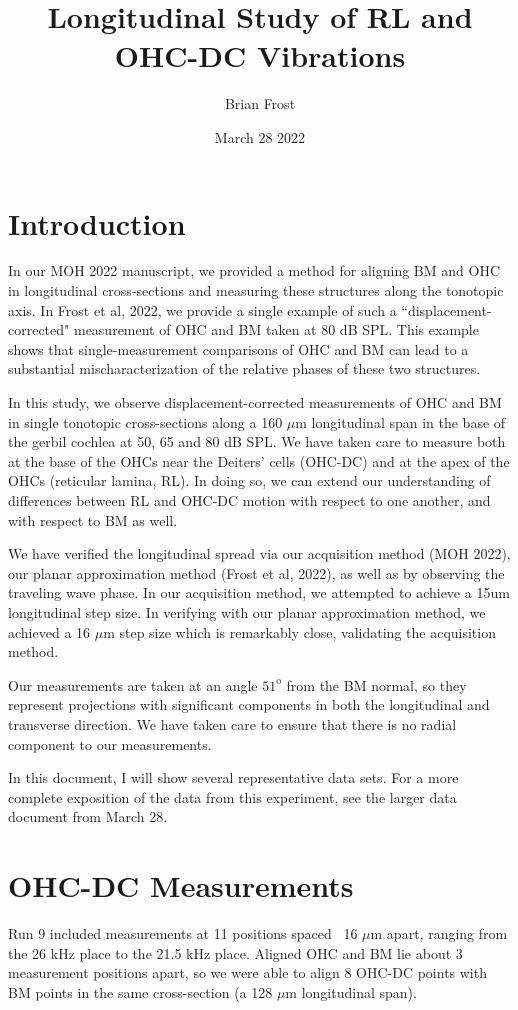 \documentclass{article}
\title{Longitudinal Study of RL and OHC-DC Vibrations}
\author{Brian Frost}
\date{March 28 2022}
\begin{document}
\maketitle

\section{Introduction}

\par{In our MOH 2022 manuscript, we provided a method for aligning BM and OHC in longitudinal cross-sections and measuring these structures along the tonotopic axis. In Frost et al, 2022, we provide a single example of such a ``displacement-corrected" measurement of OHC and BM taken at 80 dB SPL. This example shows that single-measurement comparisons of OHC and BM can lead to a substantial mischaracterization of the relative phases of these two structures.}
\par{In this study, we observe displacement-corrected measurements of OHC and BM in single tonotopic cross-sections along a 160 $\mu$m longitudinal span in the base of the gerbil cochlea at 50, 65 and 80 dB SPL. We have taken care to measure both at the base of the OHCs near the Deiters' cells (OHC-DC) and at the apex of the OHCs (reticular lamina, RL). In doing so, we can extend our understanding of differences between RL and OHC-DC motion with respect to one another, and with respect to BM as well.}
\par{We have verified the longitudinal spread via our acquisition method (MOH 2022), our planar approximation method (Frost et al, 2022), as well as by observing the traveling wave phase. In our acquisition method, we attempted to achieve a 15um longitudinal step size. In verifying with our planar approximation method, we achieved a 16 $\mu$m step size which is remarkably close, validating the acquisition method.}
\par{Our measurements are taken at an angle $51^{\text{o}}$ from the BM normal, so they represent projections with significant components in both the longitudinal and transverse direction. We have taken care to ensure that there is no radial component to our measurements.}
\par{In this document, I will show several representative data sets. For a more complete exposition of the data from this experiment, see the larger data document from March 28.}

\section{OHC-DC Measurements}
\par{Run 9 included measurements at 11 positions spaced ~16 $\mu$m apart, ranging from the 26 kHz place to the 21.5 kHz place. Aligned OHC and BM lie about 3 measurement positions apart, so we were able to align 8 OHC-DC points with BM points in the same cross-section (a 128 $\mu$m longitudinal span). }
\end{document}

